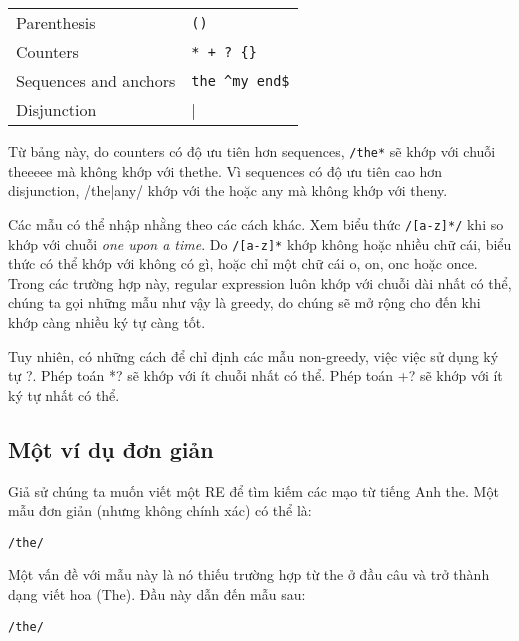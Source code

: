 \begin{center}
\begin{tabular}{ l l }
	 Parenthesis & \verb|()| \\
	 Counters  & \verb|* + ? {}| \\
	 Sequences and anchors & \verb|the ^my end$| \\
	 Disjunction & \verb||| \\
\end{tabular}
\end{center}

Từ bảng này, do counters có độ ưu tiên hơn sequences, \verb|/the*| sẽ khớp với chuỗi theeeee mà không khớp với thethe. Vì sequences có độ ưu tiên cao hơn disjunction, /the|any/ khớp với the hoặc any mà không khớp với theny.

Các mẫu có thể nhập nhằng theo các cách khác. Xem biểu thức \verb|/[a-z]*/| khi so khớp với chuỗi \textit{one upon a time}. Do \verb|/[a-z]*| khớp không hoặc nhiều chữ cái, biểu thức có thể khớp với không có gì, hoặc chỉ một chữ cái o, on, onc hoặc once. Trong các trường hợp này, regular expression luôn khớp với chuỗi dài nhất có thể, chúng ta gọi những mẫu như vậy là greedy, do chúng sẽ mở rộng cho đến khi khớp càng nhiều ký tự càng tốt.

Tuy nhiên, có những cách để chỉ định các mẫu non-greedy, việc việc sử dụng ký tự ?. Phép toán *? sẽ khớp với ít chuỗi nhất có thể. Phép toán +? sẽ khớp với ít ký tự nhất có thể.

\subsection{Một ví dụ đơn giản}

Giả sử chúng ta muốn viết một RE để tìm kiếm các mạo từ tiếng Anh the. Một mẫu đơn giản (nhưng không chính xác) có thể là:

\vspace{0.6em}

\noindent \verb|/the/|

\vspace{0.6em}

Một vấn đề với mẫu này là nó thiếu trường hợp từ the ở đầu câu và trở thành dạng viết hoa (The). Đầu này dẫn đến mẫu sau:

\vspace{0.6em}

\noindent \verb|/the/|

\vspace{0.6em}

